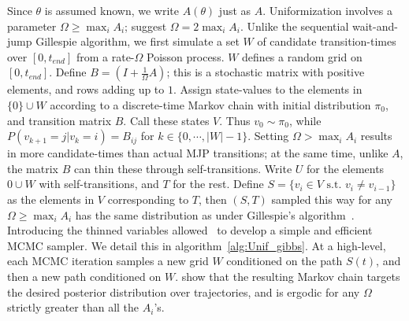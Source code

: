 Since $\theta$ is assumed known, we write $A(\theta)$ just as $A$. 
Uniformization involves a parameter $\Omega \ge \max_i A_i$; \cite{RaoTeh13} suggest $\Omega = 2 \max_i A_i$. 
Unlike the sequential wait-and-jump Gillespie algorithm, we first simulate a set $W$ of candidate transition-times over $[0,t_{end}]$ from a rate-$\Omega$ Poisson process. 
$W$ defines a random grid on $[0,t_{end}]$.
Define $B = \left(I +\frac{1}{\Omega}A\right)$; this is a stochastic matrix with positive elements, and rows adding up to $1$.
Assign state-values to the elements in $\{0\} \cup W$ according to a discrete-time Markov chain with initial distribution $\pi_0$, and transition matrix $B$.
Call these states $V$. 
Thus $v_0 \sim \pi_0$, while $P(v_{k+1}=j|v_k=i) = B_{ij}$ for $k \in \{0,\cdots,|W|-1\}$.
Setting $\Omega > \max_i A_i$ results in more candidate-times than actual MJP transitions; at the same time, unlike $A$, the matrix $B$ can thin these through self-transitions. 
Write $U$ for the elements $0 \cup W$ with self-transitions, and $T$ for the rest.
Define $S=\{v_i \in V \text{ s.t.\ } v_i \neq v_{i-1}\}$ as the elements in $V$ corresponding to $T$, then $(S,T)$ sampled this way for any $\Omega \ge \max_i A_i$
has the same distribution as under Gillespie's algorithm~\citep{Jen1953,RaoTeh13}.
Introducing the thinned variables allowed~\cite{RaoTeh13} to develop a simple and efficient MCMC sampler. 
We detail this in algorithm~\ref{alg:Unif_gibbs}. 
At a high-level, each MCMC iteration samples a new grid $W$ conditioned on the path $S(t)$, and then a new path conditioned on $W$. 
\cite{RaoTeh13} show that the resulting Markov chain targets the desired posterior distribution over trajectories, and is ergodic for any $\Omega$ strictly greater than all the $A_i$'s. 
